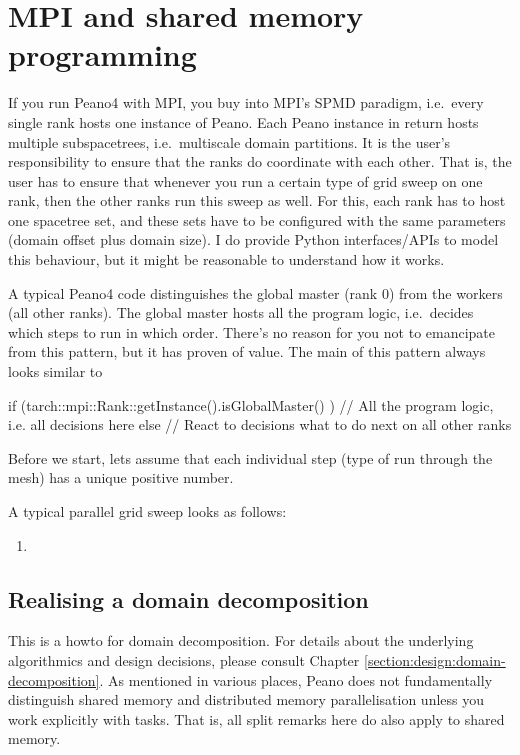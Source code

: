 \chapter{MPI and shared memory programming}
\label{section:mpi}

If you run Peano4 with MPI, you buy into MPI's SPMD paradigm, i.e.~every single
rank hosts one instance of Peano.
Each Peano instance in return hosts multiple subspacetrees, i.e.~multiscale
domain partitions.
It is the user's responsibility to ensure that the ranks do coordinate with each
other.
That is, the user has to ensure that whenever you run a certain type of grid
sweep on one rank, then the other ranks run this sweep as well.
For this, each rank has to host one spacetree set, and these sets have to be
configured with the same parameters (domain offset plus domain size).
I do provide Python interfaces/APIs to model this behaviour, but it might be
reasonable to understand how it works.



A typical Peano4 code distinguishes the global master (rank 0) from the workers
(all other ranks).
The global master hosts all the program logic, i.e.~decides which steps to run
in which order.
There's no reason for you not to emancipate from this pattern, but it has proven
of value.
The main of this pattern always looks similar to 
\begin{code}
  if (tarch::mpi::Rank::getInstance().isGlobalMaster() ) {
    // All the program logic, i.e. all decisions here
  }
  else {
    // React to decisions what to do next on all other ranks
  }
\end{code}


Before we start, lets assume that each individual step (type of run through the
mesh) has a unique positive number. 

A typical parallel grid sweep looks as follows:
\begin{enumerate}
  \item 
\end{enumerate} 



\section{Realising a domain decomposition}

This is a howto for domain decomposition. 
For details about the underlying algorithmics and design decisions, please
consult Chapter \ref{section:design:domain-decomposition}.
As mentioned in various places, Peano does not fundamentally distinguish shared
memory and distributed memory parallelisation unless you work explicitly with
tasks.
That is, all split remarks here do also apply to shared memory.


